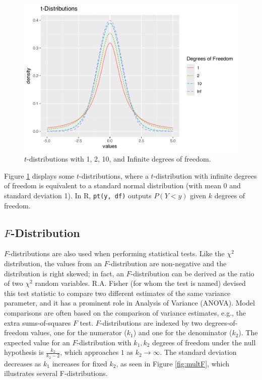 \documentclass[
]{krantz}
\begin{document}
\begin{figure}

{\centering \includegraphics[width=0.6\linewidth]{bookdown-BeyondMLR_files/figure-latex/multT-1} 

}

\caption{\(t\)-distributions with 1, 2, 10, and Infinite degrees of freedom.}\label{fig:multT}
\end{figure}

Figure \ref{fig:multT} displays some \(t\)-distributions, where a \(t\)-distribution with infinite degrees of freedom is equivalent to a standard normal distribution (with mean 0 and standard deviation 1). In R, \texttt{pt(y,\ df)} outputs \(P(Y < y)\) given \(k\) degrees of freedom.

\hypertarget{f-distribution}{%
\subsection{\texorpdfstring{\(F\)-Distribution}{F-Distribution}}\label{f-distribution}}

\(F\)-distributions  are also used when performing statistical tests. Like the \(\chi^2\) distribution, the values from an \(F\)-distribution are non-negative and the distribution is right skewed; in fact, an \(F\)-distribution can be derived as the ratio of two \(\chi^2\) random variables. R.A. Fisher (for whom the test is named) devised this test statistic to compare two different estimates of the same variance parameter, and it has a prominent role in Analysis of Variance (ANOVA). Model comparisons are often based on the comparison of variance estimates, e.g., the extra sums-of-squares \(F\) test. \(F\)-distributions are indexed by two degrees-of-freedom values, one for the numerator (\(k_1\)) and one for the denominator (\(k_2\)). The expected value for an \(F\)-distribution with \(k_1, k_2\) degrees of freedom under the null hypothesis is \(\frac{k_2}{k_2 - 2}\), which approaches \(1\) as \(k_2 \rightarrow \infty\). The standard deviation decreases as \(k_1\) increases for fixed \(k_2\), as seen in Figure \ref{fig:multF}, which illustrates several F-distributions.
\end{document}
